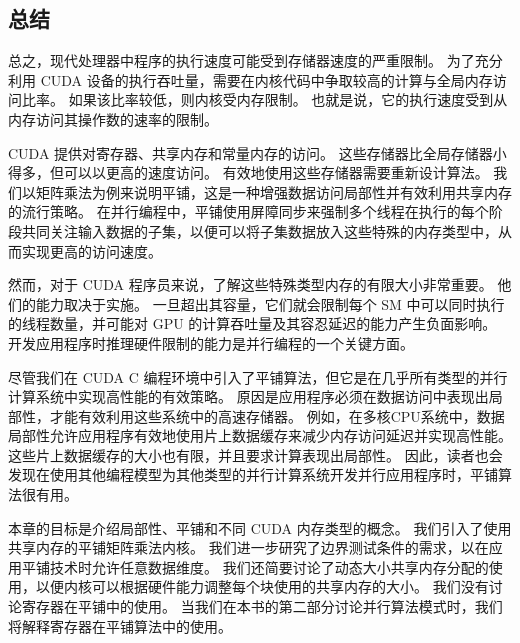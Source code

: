 \subsection{总结}
总之，现代处理器中程序的执行速度可能受到存储器速度的严重限制。 为了充分利用 CUDA 设备的执行吞吐量，需要在内核代码中争取较高的计算与全局内存访问比率。 如果该比率较低，则内核受内存限制。 也就是说，它的执行速度受到从内存访问其操作数的速率的限制。

CUDA 提供对寄存器、共享内存和常量内存的访问。 这些存储器比全局存储器小得多，但可以以更高的速度访问。 有效地使用这些存储器需要重新设计算法。 我们以矩阵乘法为例来说明平铺，这是一种增强数据访问局部性并有效利用共享内存的流行策略。 在并行编程中，平铺使用屏障同步来强制多个线程在执行的每个阶段共同关注输入数据的子集，以便可以将子集数据放入这些特殊的内存类型中，从而实现更高的访问速度。

然而，对于 CUDA 程序员来说，了解这些特殊类型内存的有限大小非常重要。 他们的能力取决于实施。 一旦超出其容量，它们就会限制每个 SM 中可以同时执行的线程数量，并可能对 GPU 的计算吞吐量及其容忍延迟的能力产生负面影响。 开发应用程序时推理硬件限制的能力是并行编程的一个关键方面。

尽管我们在 CUDA C 编程环境中引入了平铺算法，但它是在几乎所有类型的并行计算系统中实现高性能的有效策略。 原因是应用程序必须在数据访问中表现出局部性，才能有效利用这些系统中的高速存储器。 例如，在多核CPU系统中，数据局部性允许应用程序有效地使用片上数据缓存来减少内存访问延迟并实现高性能。 这些片上数据缓存的大小也有限，并且要求计算表现出局部性。 因此，读者也会发现在使用其他编程模型为其他类型的并行计算系统开发并行应用程序时，平铺算法很有用。

本章的目标是介绍局部性、平铺和不同 CUDA 内存类型的概念。 我们引入了使用共享内存的平铺矩阵乘法内核。 我们进一步研究了边界测试条件的需求，以在应用平铺技术时允许任意数据维度。 我们还简要讨论了动态大小共享内存分配的使用，以便内核可以根据硬件能力调整每个块使用的共享内存的大小。 我们没有讨论寄存器在平铺中的使用。 当我们在本书的第二部分讨论并行算法模式时，我们将解释寄存器在平铺算法中的使用。
